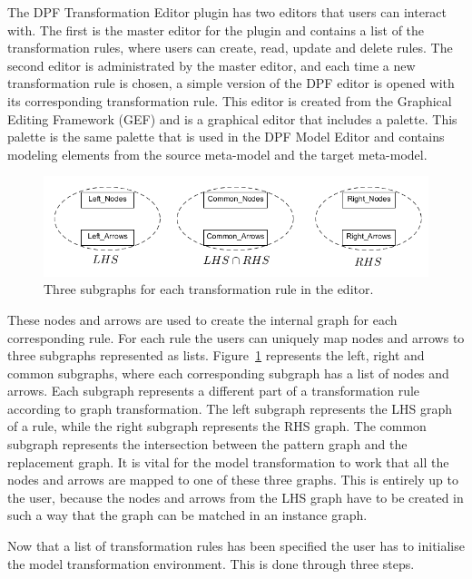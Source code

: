 The DPF Transformation Editor plugin has two editors that users can interact with.
The first is the master editor for the plugin and contains a list of the
transformation rules, where users can create, read, update and delete rules. The
second editor is administrated by the master editor, and each time a new
transformation rule is chosen, a simple version of the DPF editor is opened
with its corresponding transformation rule. This editor is created from the 
Graphical Editing Framework (GEF) and is a graphical editor that includes a
palette. This palette is the same palette that is used in the DPF Model Editor
and contains modeling elements from the source meta-model and the target
meta-model.

\begin{figure}[H]
	\centering
	\includegraphics[scale=0.7]{./Figures/left_common_right.png}
	\caption[The three subgraphs for a transformation rule.]
	{Three subgraphs for each transformation rule in the editor.}
	\label{fig:lists_editor}
\end{figure}

These nodes and arrows are used to create the internal graph for each
corresponding rule. For each rule the users can uniquely map nodes and arrows to
three subgraphs represented as lists. Figure~\ref{fig:lists_editor} represents
the left, right and common subgraphs, where each corresponding subgraph
has a list of nodes and arrows. Each subgraph represents a different part of a
transformation rule according to graph transformation. The left subgraph
represents the LHS graph of a rule, while the right subgraph represents the RHS
graph. The common subgraph represents the intersection between the pattern
graph and the replacement graph. It is vital for the model transformation to
work that all the nodes and arrows are mapped to one of these three graphs.
This is entirely up to the user, because the nodes and arrows from the LHS
graph have to be created in such a way that the graph can be matched in an
instance graph.

Now that a list of transformation rules has been specified the user has to
initialise the model transformation environment. This is done through three
steps. 

